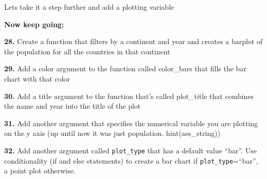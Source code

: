 \documentclass[]{book}
\newenvironment{Shaded}{\begin{snugshade}}{\end{snugshade}}
\newcommand{\ControlFlowTok}[1]{\textcolor[rgb]{0.13,0.29,0.53}{\textbf{#1}}}
\newcommand{\DataTypeTok}[1]{\textcolor[rgb]{0.13,0.29,0.53}{#1}}
\newcommand{\KeywordTok}[1]{\textcolor[rgb]{0.13,0.29,0.53}{\textbf{#1}}}
\newcommand{\NormalTok}[1]{#1}
\newcommand{\OperatorTok}[1]{\textcolor[rgb]{0.81,0.36,0.00}{\textbf{#1}}}
\newcommand{\StringTok}[1]{\textcolor[rgb]{0.31,0.60,0.02}{#1}}
\begin{document}
Lets take it a step further and add a plotting variable

\begin{Shaded}
\end{Shaded}

\textbf{Now keep going:}

\textbf{28.} Create a function that filters by a continent and year and creates a barplot of the population for all the countries in that continent

\textbf{29.} Add a color argument to the function called color\_bars that fills the bar chart with that color

\textbf{30.} Add a title argument to the function that's called plot\_title that combines the name and year into the title of the plot

\textbf{31.} Add another argument that specifies the numerical variable you are plotting on the y axis (up until now it was just population. hint(aes\_string))

\textbf{32.} Add another argument called \texttt{plot\_type} that has a default value ``bar''. Use conditionality (if and else statements) to create a bar chart if \texttt{plot\_type}=``bar'', a point plot otherwise.
\end{document}
